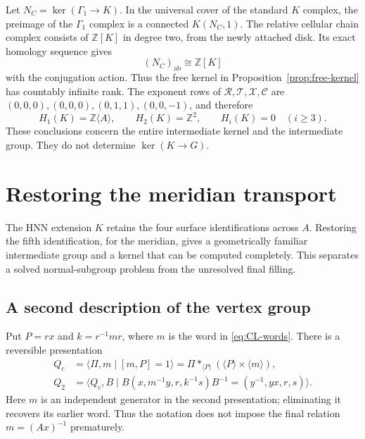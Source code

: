 \documentclass[11pt]{amsart}
\theoremstyle{definition}
\theoremstyle{remark}
\newcommand{\Z}{\mathbb Z}
\begin{document}
Let $N_C=\ker(\Gamma_1\to K)$. In the universal cover of the
standard $K$ complex, the preimage of the $\Gamma_1$ complex is a
connected $K(N_C,1)$. The relative cellular chain complex consists
of $\Z[K]$ in degree two, from the newly attached disk. Its exact
homology sequence gives
\[
 (N_C)_{\mathrm{ab}}\cong\Z[K]
\]
with the conjugation action. Thus the free kernel in
Proposition~\ref{prop:free-kernel} has countably infinite rank.
The exponent rows of $\mathcal R,\mathcal T,\mathcal X,\mathcal C$
are $(0,0,0),(0,0,0),(0,1,1),(0,0,-1)$, and therefore
\[
 H_1(K)=\Z\langle A\rangle,\qquad H_2(K)=\Z^2,
 \qquad H_i(K)=0\quad(i\ge3).
\]
These conclusions concern the entire intermediate kernel and the
intermediate group. They do not determine $\ker(K\to G)$.

\section{Restoring the meridian transport}\label{sec:transport}

The HNN extension $K$ retains the four surface identifications across
$A$. Restoring the fifth identification, for the meridian, gives a
geometrically familiar intermediate group and a kernel that can be
computed completely. This separates a solved normal-subgroup problem
from the unresolved final filling.

\subsection{A second description of the vertex group}
Put $P=rx$ and $k=r^{-1}mr$, where $m$ is the word in
\eqref{eq:CL-words}. There is a reversible presentation
\begin{equation}\label{eq:Qc}
\begin{aligned}
 Q_c&=\langle\Pi,m\mid[m,P]=1\rangle
      =\Pi*_{\langle P\rangle}(\langle P\rangle\times\langle m\rangle),\\
 Q_2&=\langle Q_c,B\mid
 B(x,m^{-1}y,r,k^{-1}s)B^{-1}=(y^{-1},yx,r,s)\rangle.
\end{aligned}
\end{equation}
Here $m$ is an independent generator in the second presentation;
eliminating it recovers its earlier word. Thus the notation does not
impose the final relation $m=(Ax)^{-1}$ prematurely.
\end{document}
